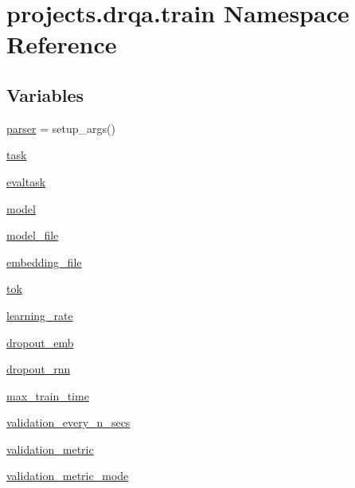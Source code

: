 \hypertarget{namespaceprojects_1_1drqa_1_1train}{}\section{projects.\+drqa.\+train Namespace Reference}
\label{namespaceprojects_1_1drqa_1_1train}
\subsection*{Variables}
\begin{DoxyCompactItemize}
\item 
\hyperlink{namespaceprojects_1_1drqa_1_1train_a2f0306b8f4cc49723a361d3d6fded6ec}{parser} = setup\+\_\+args()
\item 
\hyperlink{namespaceprojects_1_1drqa_1_1train_a944d6454a737b21088417a75997db128}{task}
\item 
\hyperlink{namespaceprojects_1_1drqa_1_1train_a3488e2b6c4b815dfef8b90e71d019ea6}{evaltask}
\item 
\hyperlink{namespaceprojects_1_1drqa_1_1train_ae72a95e8b2b92c466981a4e4f27679df}{model}
\item 
\hyperlink{namespaceprojects_1_1drqa_1_1train_a11f7657b75bca85e3accda577cf994d9}{model\+\_\+file}
\item 
\hyperlink{namespaceprojects_1_1drqa_1_1train_a82224594b0f57ab62c18eb9eee7e5ab6}{embedding\+\_\+file}
\item 
\hyperlink{namespaceprojects_1_1drqa_1_1train_ae722671b9c00144ddcd9711936a07977}{tok}
\item 
\hyperlink{namespaceprojects_1_1drqa_1_1train_a42c586e15e2020fe388006e91e9fbdff}{learning\+\_\+rate}
\item 
\hyperlink{namespaceprojects_1_1drqa_1_1train_a9164658c897350ad4ed372ff1cef63e5}{dropout\+\_\+emb}
\item 
\hyperlink{namespaceprojects_1_1drqa_1_1train_a5c5d60fd6869c1359539252d24115883}{dropout\+\_\+rnn}
\item 
\hyperlink{namespaceprojects_1_1drqa_1_1train_ae6f2d3306ef14b521025d7fcf02e174f}{max\+\_\+train\+\_\+time}
\item 
\hyperlink{namespaceprojects_1_1drqa_1_1train_a9f41c45c7fe5bc2823d8aa1da350a178}{validation\+\_\+every\+\_\+n\+\_\+secs}
\item 
\hyperlink{namespaceprojects_1_1drqa_1_1train_a4c022d1e0f9e0b5b93df817e5830eb40}{validation\+\_\+metric}
\item 
\hyperlink{namespaceprojects_1_1drqa_1_1train_a991f5e4a1bc037d3a511ad26da1c8261}{validation\+\_\+metric\+\_\+mode}

\end{DoxyCompactItemize}
